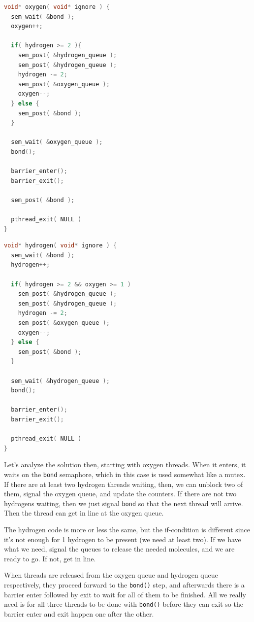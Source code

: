 \documentclass[a4paper]{report}
\begin{document}
\begin{multicols}{2}
	\begin{lstlisting}[language=C]
void* oxygen( void* ignore ) {
  sem_wait( &bond );
  oxygen++;
  
  if( hydrogen >= 2 ){
    sem_post( &hydrogen_queue );
    sem_post( &hydrogen_queue );
    hydrogen -= 2;
    sem_post( &oxygen_queue );
    oxygen--;
  } else {
    sem_post( &bond );
  }
  
  sem_wait( &oxygen_queue );
  bond();

  barrier_enter();
  barrier_exit();

  sem_post( &bond );
  
  pthread_exit( NULL )
}
\end{lstlisting}
	\columnbreak
	\begin{lstlisting}[language=C]
void* hydrogen( void* ignore ) {
  sem_wait( &bond );
  hydrogen++;
  
  if( hydrogen >= 2 && oxygen >= 1 )
    sem_post( &hydrogen_queue );
    sem_post( &hydrogen_queue );
    hydrogen -= 2;
    sem_post( &oxygen_queue );
    oxygen--;
  } else {
    sem_post( &bond );
  }
  
  sem_wait( &hydrogen_queue );
  bond();
  
  barrier_enter();
  barrier_exit();
  
  pthread_exit( NULL )
}
\end{lstlisting}
\end{multicols}


Let's analyze the solution then, starting with oxygen threads. When it enters, it waits on the \texttt{bond} semaphore, which in this case is used somewhat like a mutex. If there are at least two hydrogen threads waiting, then, we can unblock two of them, signal the oxygen queue, and update the counters. If there are not two hydrogens waiting, then we just signal \texttt{bond} so that the next thread will arrive. Then the thread can get in line at the oxygen queue.

The hydrogen code is more or less the same, but the if-condition is different since it's not enough for 1 hydrogen to be present (we need at least two). If we have what we need, signal the queues to release the needed molecules, and we are ready to go. If not, get in line.

When threads are released from the oxygen queue and hydrogen queue respectively, they proceed forward to the \texttt{bond()} step, and afterwards there is a barrier enter followed by exit to wait for all of them to be finished. All we really need is for all three threads to be done with \texttt{bond()} before they can exit so the barrier enter and exit happen one after the other.
\end{document}
